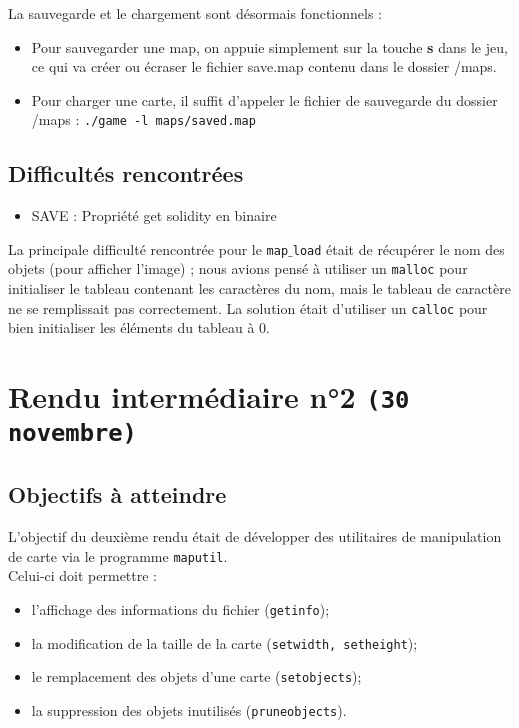 \documentclass[a4paper, 12pt]{article}
\begin{document}
La sauvegarde et le chargement sont désormais fonctionnels :
\begin{itemize}
	\item Pour sauvegarder une map, on appuie simplement sur la touche \textbf{s} dans le jeu, ce qui va créer ou écraser le fichier save.map contenu dans le dossier /maps.

	\item Pour charger une carte, il suffit d'appeler le fichier de sauvegarde du dossier /maps : \texttt{./game -l maps/saved.map}
\end{itemize}


	\subsection{Difficultés rencontrées}%
	
	\begin{itemize}
	\item SAVE : Propriété get solidity en binaire \\
	\end{itemize}
	
	La principale difficulté rencontrée pour le \texttt{map$\_$load} était de récupérer le nom des objets (pour afficher l'image) ; nous avions pensé à utiliser un \texttt{malloc} pour initialiser le tableau contenant les caractères du nom, mais le tableau de caractère ne se remplissait pas correctement. La solution était d'utiliser un \texttt{calloc} pour bien initialiser les éléments du tableau à 0. 
	
\newpage
\section{Rendu intermédiaire n°2 \texttt{(30 novembre)}}
	\subsection{Objectifs à atteindre}
	
	L'objectif du deuxième rendu était de développer des utilitaires de manipulation de carte via le programme \texttt{maputil}. \\
	Celui-ci doit permettre :
	\begin{itemize}
		\item l'affichage des informations du fichier (\texttt{getinfo});
		\item la modification de la taille de la carte (\texttt{setwidth, setheight});
		\item le remplacement des objets d'une carte (\texttt{setobjects});
		\item la suppression des objets inutilisés (\texttt{pruneobjects}). \\
	\end{itemize}
\end{document}
